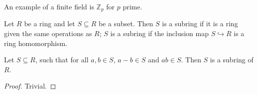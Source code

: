 An example of a finite field is $\mathbb{Z} _p$ for $p$ prime.
\begin{definition}[Subring]\label{dfn:1.4}
	Let $R$ be a ring and let $S\subseteq R$ be a subset. Then $S$ is a subring if it is a ring given the same operations as $R$; $S$ is a subring if the inclusion map $S\hookrightarrow R$ is a ring homomorphism.
\end{definition}
\begin{proposition}\label{prp:1.5}
	Let $S\subseteq R$, such that for all $a,b\in S$, $a-b\in S$ and $ab\in S$. Then $S$ is a subring of $R$.
\end{proposition}
\begin{proof}
	Trivial.
\end{proof}

